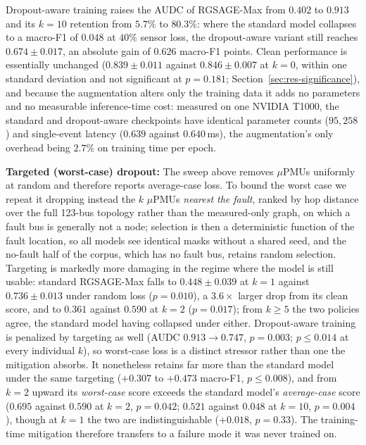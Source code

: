 \documentclass[3p,times,procedia]{elsarticle}
\begin{document}
Dropout-aware training raises the AUDC of RGSAGE-Max from $0.402$ to $0.913$ and its $k=10$ retention from $5.7\%$ to $80.3\%$: where the standard model collapses to a macro-F1 of $0.048$ at $40\%$ sensor loss, the dropout-aware variant still reaches $0.674\pm0.017$, an absolute gain of $0.626$ macro-F1 points. Clean performance is essentially unchanged ($0.839\pm0.011$ against $0.846\pm0.007$ at $k=0$, within one standard deviation and not significant at $p=0.181$; Section~\ref{sec:res-significance}), and because the augmentation alters only the training data it adds no parameters and no measurable inference-time cost: measured on one NVIDIA T1000, the standard and dropout-aware checkpoints have identical parameter counts ($95{,}258$) and single-event latency ($0.639$ against $0.640$\,ms), the augmentation's only overhead being $2.7\%$ on training time per epoch.

\textbf{Targeted (worst-case) dropout:} The sweep above removes $\mu$PMUs uniformly at random and therefore reports average-case loss. To bound the worst case we repeat it dropping instead the $k$ $\mu$PMUs \emph{nearest the fault}, ranked by hop distance over the full 123-bus topology rather than the measured-only graph, on which a fault bus is generally not a node; selection is then a deterministic function of the fault location, so all models see identical masks without a shared seed, and the no-fault half of the corpus, which has no fault bus, retains random selection. Targeting is markedly more damaging in the regime where the model is still usable: standard RGSAGE-Max falls to $0.448\pm0.039$ at $k=1$ against $0.736\pm0.013$ under random loss ($p=0.010$), a $3.6\times$ larger drop from its clean score, and to $0.361$ against $0.590$ at $k=2$ ($p=0.017$); from $k\ge5$ the two policies agree, the standard model having collapsed under either. Dropout-aware training is penalized by targeting as well (AUDC $0.913\!\to\!0.747$, $p=0.003$; $p\le0.014$ at every individual $k$), so worst-case loss is a distinct stressor rather than one the mitigation absorbs. It nonetheless retains far more than the standard model under the same targeting ($+0.307$ to $+0.473$ macro-F1, $p\le0.008$), and from $k=2$ upward its \emph{worst-case} score exceeds the standard model's \emph{average-case} score ($0.695$ against $0.590$ at $k=2$, $p=0.042$; $0.521$ against $0.048$ at $k=10$, $p=0.004$), though at $k=1$ the two are indistinguishable ($+0.018$, $p=0.33$). The training-time mitigation therefore transfers to a failure mode it was never trained on.
\end{document}
